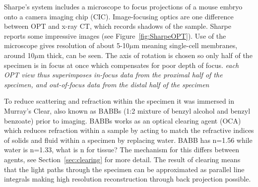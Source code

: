 \documentclass[12pt]{article}
\begin{document}
Sharpe's system includes a microscope to focus projections of a mouse embryo onto a camera imaging chip (CIC). Image-focusing optics are one difference between OPT and x-ray CT, which records shadows of the sample. \cite{Sharpe:2002jp} Sharpe reports some impressive images (see Figure~\ref{fig:SharpeOPT}). Use of the microscope gives resolution of about 5-10$\mu$m meaning single-cell membranes, around 10$\mu$m thick, can be seen.\cite{Sharpe:2002jp} The axis of rotation is chosen so only half of the specimen is in focus at once which compensates for poor depth of focus. \textit{each OPT view thus superimposes in-focus data from the proximal half of the specimen, and out-of-focus data from the distal half of the specimen} \cite{Walls:2005ja}

To reduce scattering and refraction within the specimen it was immersed in Murray's Clear, also known as BABBs (1:2 mixture of benzyl alcohol and benzyl benzoate) prior to imaging. BABBs works as an optical clearing agent (OCA) which reduces refraction within a sample by acting to match the refractive indices of solids and fluid within a specimen by replacing water. BABB has n=1.56 while water is n=1.33, what is n for tissue? \cite{Walls:2005ja} The mechanism for this differs between agents, see Section~\ref{sec:clearing} for more detail. 
The result of clearing means that the light paths through the specimen can be approximated as parallel line integrals  making high resolution reconstruction through back projection possible.
\end{document}
